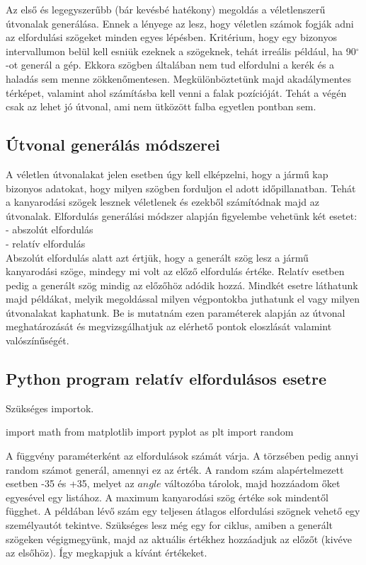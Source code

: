 

Az első és legegyszerűbb (bár kevésbé hatékony) megoldás a véletlenszerű útvonalak generálása. Ennek a lényege az lesz, hogy véletlen számok fogják adni az elfordulási szögeket minden egyes lépésben. Kritérium, hogy egy bizonyos intervallumon belül kell esniük ezeknek a szögeknek, tehát irreális például, ha 90$^\circ$-ot generál a gép. Ekkora szögben általában nem tud elfordulni a kerék és a haladás sem menne zökkenőmentesen. Megkülönböztetünk majd akadálymentes térképet, valamint ahol számításba kell venni a falak pozícióját. Tehát a végén csak az lehet jó útvonal, ami nem ütközött falba egyetlen pontban sem.\\

\subsection{Útvonal generálás módszerei}

A véletlen útvonalakat jelen esetben úgy kell elképzelni, hogy a jármű kap bizonyos adatokat, hogy milyen szögben forduljon el adott időpillanatban. Tehát a kanyarodási szögek lesznek véletlenek és ezekből számítódnak majd az útvonalak. Elfordulás generálási módszer alapján figyelembe vehetünk két esetet:\\
\phantom{len}- abszolút elfordulás\\ 
\phantom{len}- relatív elfordulás\\
Abszolút elfordulás alatt azt értjük, hogy a generált szög lesz a jármű kanyarodási szöge, mindegy mi volt az előző elfordulás értéke. Relatív esetben pedig a generált szög mindig az előzőhöz adódik hozzá. Mindkét esetre láthatunk majd példákat, melyik megoldással milyen végpontokba juthatunk el vagy milyen útvonalakat kaphatunk. Be is mutatnám ezen paraméterek alapján az útvonal meghatározását és megvizsgálhatjuk az elérhető pontok eloszlását valamint valószínűségét.


\subsection{Python program relatív elfordulásos esetre}

Szükséges importok.
\begin{python}
import math
from matplotlib import pyplot as plt
import random
\end{python}

A függvény paraméterként az elfordulások számát várja. A törzsében pedig annyi random számot generál, amennyi ez az érték. A random szám alapértelmezett esetben -35 és +35, melyet az $ angle $ változóba tárolok, majd hozzáadom őket egyesével egy listához. A maximum kanyarodási szög értéke sok mindentől függhet. A példában lévő szám egy teljesen átlagos elfordulási szögnek vehető egy személyautót tekintve. Szükséges lesz még egy for ciklus, amiben a generált szögeken végigmegyünk, majd az aktuális értékhez hozzáadjuk az előzőt (kivéve az elsőhöz). Így megkapjuk a kívánt értékeket. 

